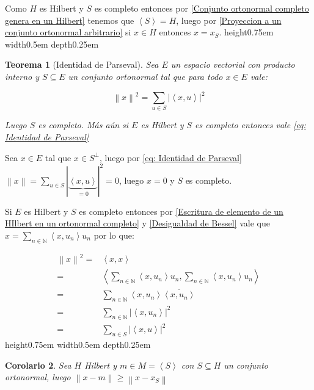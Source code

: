 \documentclass[11pt]{article}
\newcommand{\N}{{\mathbb{N}}}
\newcommand{\norm}[1]{\left\lVert#1\right\rVert}
\newcommand{\abs}[1]{\left\lvert#1\right\rvert}
\newcommand{\ip}[1]{\left\langle#1\right\rangle}
\newcommand{\Bigsum}[2]{\sum\limits_{#1}{#2}}
\newtheorem{theorem}{Teorema}
\numberwithin{theorem}{subsection}
\newtheorem{corollary}[theorem]{Corolario}
\newenvironment{proof}[1][Demostraci\'on]{\begin{trivlist}
		\item[\hskip \labelsep {\bfseries #1}]}{\end{trivlist}}
\newcommand{\qed}{\nobreak \ifvmode \relax \else
	\ifdim\lastskip<1.5em \hskip-\lastskip
	\hskip1.5em plus0em minus0.5em \fi \nobreak
	\vrule height0.75em width0.5em depth0.25em\fi}
\begin{document}
\begin{proof}
	Como $H$ es Hilbert y $S$ es completo entonces por \ref{Conjunto ortonormal completo genera en un Hilbert} tenemos que $\ip{S} = H$, luego por \ref{Proyeccion a un conjunto ortonormal arbitrario} si $x \in H$ entonces $x = x_S$. \qed 
\end{proof}

\begin{theorem}[Identidad de Parseval]
	\label{Identidad de Parseval}
	Sea $E$ un espacio vectorial con producto interno y $S \subseteq E$ un conjunto ortonormal tal que para todo $x \in E$ vale:
	
	\begin{equation}
	\label{eq: Identidad de Parseval}
		\norm{x}^2 = \Bigsum{u \in S}{\abs{\ip{x,u}}^2}
	\end{equation}
	
	Luego $S$ es completo. M\'as a\'un si $E$ es Hilbert y $S$ es completo entonces vale \ref{eq: Identidad de Parseval}
\end{theorem}

\begin{proof}
	Sea $x \in E$ tal que $x \in S^{\perp}$, luego por \ref{eq: Identidad de Parseval} $\norm{x} = \Bigsum{u \in S}{\abs{\underbrace{\ip{x,u}}_{=0}}^2} = 0$, luego $x = 0$ y $S$ es completo.
	
	Si $E$ es Hilbert y $S$ es completo entonces por \ref{Escritura de elemento de un HIlbert en un ortonormal completo} y \ref{Desigualdad de Bessel} vale que $x = \Bigsum{n \in \N}{\ip{x,u_n}u_n}$ por lo que:
	
	\begin{equation*}
		\begin{aligned}
			\norm{x}^2 = & \ip{x,x}  \\
			= & \ip{\Bigsum{n \in \N}{\ip{x,u_n}u_n},\Bigsum{n \in \N}{\ip{x,u_n}u_n}} \\
			= & \Bigsum{n \in \N}{\ip{x,u_n}\overline{\ip{x,u_n}}} \\
			= & \Bigsum{n \in \N}{\abs{\ip{x,u_n}}^2} \\
			= & \Bigsum{u \in S}{\abs{\ip{x,u}}^2}
		\end{aligned}
	\end{equation*}
	\qed
\end{proof}

\begin{corollary}
	Sea $H$ Hilbert y $m \in M = \ip{S}$ con $S \subseteq H$ un conjunto ortonormal, luego $\norm{x-m} \geq \norm{x - x_S}$
\end{corollary}
\end{document}
